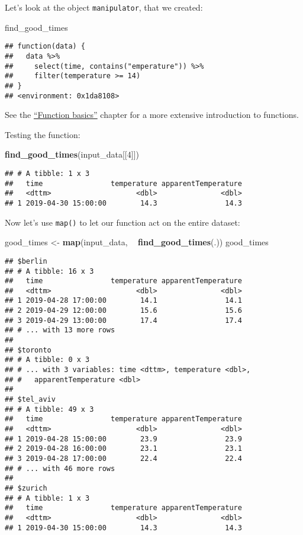 \documentclass[]{book}
\newenvironment{Shaded}{\begin{snugshade}}{\end{snugshade}}
\newcommand{\DecValTok}[1]{\textcolor[rgb]{0.00,0.00,0.81}{#1}}
\newcommand{\KeywordTok}[1]{\textcolor[rgb]{0.13,0.29,0.53}{\textbf{#1}}}
\newcommand{\NormalTok}[1]{#1}
\newcommand{\OperatorTok}[1]{\textcolor[rgb]{0.81,0.36,0.00}{\textbf{#1}}}
\newcommand{\StringTok}[1]{\textcolor[rgb]{0.31,0.60,0.02}{#1}}
\begin{document}
Let's look at the object \texttt{manipulator}, that we created:

\begin{Shaded}
\begin{Highlighting}[]
\NormalTok{find_good_times}
\end{Highlighting}
\end{Shaded}

\begin{verbatim}
## function(data) {
##   data %>%
##     select(time, contains("emperature")) %>%
##     filter(temperature >= 14)
## }
## <environment: 0x1da8108>
\end{verbatim}

See the \protect\hyperlink{function-basics}{``Function basics''} chapter for a more extensive introduction to functions.

Testing the function:

\begin{Shaded}
\begin{Highlighting}[]
\KeywordTok{find_good_times}\NormalTok{(input_data[[}\DecValTok{4}\NormalTok{]])}
\end{Highlighting}
\end{Shaded}

\begin{verbatim}
## # A tibble: 1 x 3
##   time                temperature apparentTemperature
##   <dttm>                    <dbl>               <dbl>
## 1 2019-04-30 15:00:00        14.3                14.3
\end{verbatim}

Now let's use \texttt{map()} to let our function act on the entire dataset:

\begin{Shaded}
\begin{Highlighting}[]
\NormalTok{good_times <-}\StringTok{ }\KeywordTok{map}\NormalTok{(input_data, }\OperatorTok{~}\StringTok{ }\KeywordTok{find_good_times}\NormalTok{(.))}
\NormalTok{good_times}
\end{Highlighting}
\end{Shaded}

\begin{verbatim}
## $berlin
## # A tibble: 16 x 3
##   time                temperature apparentTemperature
##   <dttm>                    <dbl>               <dbl>
## 1 2019-04-28 17:00:00        14.1                14.1
## 2 2019-04-29 12:00:00        15.6                15.6
## 3 2019-04-29 13:00:00        17.4                17.4
## # ... with 13 more rows
## 
## $toronto
## # A tibble: 0 x 3
## # ... with 3 variables: time <dttm>, temperature <dbl>,
## #   apparentTemperature <dbl>
## 
## $tel_aviv
## # A tibble: 49 x 3
##   time                temperature apparentTemperature
##   <dttm>                    <dbl>               <dbl>
## 1 2019-04-28 15:00:00        23.9                23.9
## 2 2019-04-28 16:00:00        23.1                23.1
## 3 2019-04-28 17:00:00        22.4                22.4
## # ... with 46 more rows
## 
## $zurich
## # A tibble: 1 x 3
##   time                temperature apparentTemperature
##   <dttm>                    <dbl>               <dbl>
## 1 2019-04-30 15:00:00        14.3                14.3
\end{verbatim}
\end{document}

